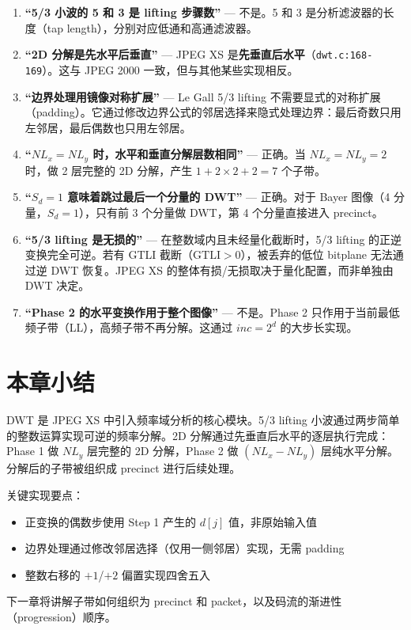 \begin{misunderstanding}
\begin{enumerate}
  \item \textbf{``5/3 小波的 5 和 3 是 lifting 步骤数''} --- 不是。5 和 3 是分析滤波器的长度（tap length），分别对应低通和高通滤波器。
  \item \textbf{``2D 分解是先水平后垂直''} --- JPEG XS 是\textbf{先垂直后水平}（\texttt{dwt.c:168-169}）。这与 JPEG 2000 一致，但与其他某些实现相反。
  \item \textbf{``边界处理用镜像对称扩展''} --- Le Gall 5/3 lifting 不需要显式的对称扩展（padding）。它通过修改边界公式的邻居选择来隐式处理边界：最后奇数只用左邻居，最后偶数也只用左邻居。
  \item \textbf{``$NL_x = NL_y$ 时，水平和垂直分解层数相同''} --- 正确。当 $NL_x = NL_y = 2$ 时，做 2 层完整的 2D 分解，产生 $1 + 2 \times 2 + 2 = 7$ 个子带。
  \item \textbf{``$S_d = 1$ 意味着跳过最后一个分量的 DWT''} --- 正确。对于 Bayer 图像（4 分量，$S_d = 1$），只有前 3 个分量做 DWT，第 4 个分量直接进入 precinct。
  \item \textbf{``5/3 lifting 是无损的''} --- 在整数域内且未经量化截断时，5/3 lifting 的正逆变换完全可逆。若有 GTLI 截断（$\mathrm{GTLI}>0$），被丢弃的低位 bitplane 无法通过逆 DWT 恢复。JPEG XS 的整体有损/无损取决于量化配置，而非单独由 DWT 决定。
  \item \textbf{``Phase 2 的水平变换作用于整个图像''} --- 不是。Phase 2 只作用于当前最低频子带（LL），高频子带不再分解。这通过 $\mathit{inc} = 2^d$ 的大步长实现。
\end{enumerate}
\end{misunderstanding}

\section{本章小结}

DWT 是 JPEG XS 中引入频率域分析的核心模块。5/3 lifting 小波通过两步简单的整数运算实现可逆的频率分解。2D 分解通过先垂直后水平的逐层执行完成：Phase 1 做 $NL_y$ 层完整的 2D 分解，Phase 2 做 $(NL_x - NL_y)$ 层纯水平分解。分解后的子带被组织成 precinct 进行后续处理。

关键实现要点：
\begin{itemize}
  \item 正变换的偶数步使用 Step 1 产生的 $d[j]$ 值，非原始输入值
  \item 边界处理通过修改邻居选择（仅用一侧邻居）实现，无需 padding
  \item 整数右移的 $+1$/$+2$ 偏置实现四舍五入
\end{itemize}

下一章将讲解子带如何组织为 precinct 和 packet，以及码流的渐进性（progression）顺序。
